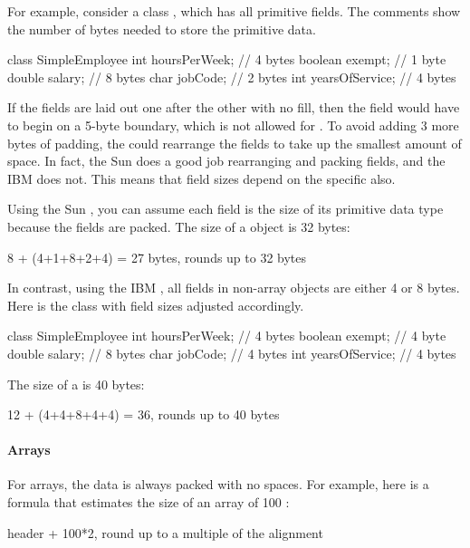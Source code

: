 For example, consider a class , which has all primitive fields. The comments show the number of bytes needed to store the primitive data.

\begin{shortlisting}
class SimpleEmployee {
    int hoursPerWeek;     // 4 bytes       
    boolean exempt;       // 1 byte          
    double salary;        // 8 bytes          
    char jobCode;         // 2 bytes           
    int yearsOfService;   // 4 bytes      	
}
\end{shortlisting}

If the fields are laid out one after the other with no fill, then the field  would have to begin on a 5-byte boundary, which is not allowed for . To avoid adding 3 more bytes of padding, the \jre could rearrange the fields to take up the smallest amount of space. In fact, the Sun  \jre does a good job rearranging and packing fields, and the IBM \jre does not. This means that field sizes depend on the specific \jre also. 

Using the Sun \jre, you can assume each field is the size of its primitive data type because the fields are packed. The size of a
 object is 32 bytes:

\begin{shortlisting}               
8 + (4+1+8+2+4) = 27 bytes, rounds up to 32 bytes
\end{shortlisting} 

In contrast, using the IBM \jre, all fields in non-array objects are either 4 or
8 bytes. Here is the  class with field sizes adjusted
accordingly.
\begin{shortlisting} 
class SimpleEmployee {
    int hoursPerWeek;        // 4 bytes
    boolean exempt;          // 4 byte
    double salary;           // 8 bytes
    char jobCode;            // 4 bytes
    int yearsOfService;      // 4 bytes
}
\end{shortlisting}
The size of a  is 40 bytes:
\begin{shortlisting}
12 + (4+4+8+4+4) = 36, rounds up to 40 bytes
\end{shortlisting}

\paragraph{Arrays} For arrays, the data is always packed with no spaces. For
example, here is a formula that estimates the size of an array of 100 :
\begin{shortlisting}
header + 100*2, round up to a multiple of the alignment
\end{shortlisting}

